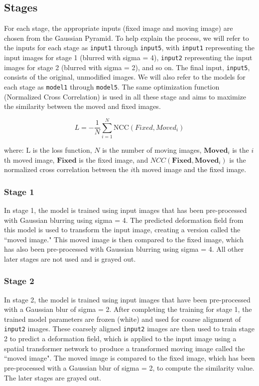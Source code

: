 \documentclass{book}
\begin{document}
	\subsection{Stages}
	For each stage, the appropriate inputs (fixed image and moving image) are chosen from the Gaussian Pyramid. To help explain the process, we will refer to the inputs for each stage as \texttt{input1} through \texttt{input5}, with \texttt{input1} representing the input images for stage 1 (blurred with sigma = 4), \texttt{input2} representing the input images for stage 2 (blurred with sigma = 2), and so on. The final input, \texttt{input5}, consists of the original, unmodified images. We will also refer to the models for each stage as \texttt{model1} through \texttt{model5}. The same optimization function (Normalized Cross Correlation) is used in all these stage and aims to maximize the similarity between the moved and fixed images.
	
	\begin{equation}
		L = -\frac{1}{N} \sum_{i=1}^N \text{NCC}(Fixed, Moved_i)
	\end{equation}
	
	where:
		$\text{L}$ is the loss function, $N$ is the number of moving images, $\mathbf{Moved}_i$ is the $i$th moved image, $\mathbf{Fixed}$ is the fixed image, and $NCC(\mathbf{Fixed}, \mathbf{Moved}_i)$ is the normalized cross correlation between the $i$th moved image and the fixed image.
	
	\subsubsection{Stage 1}
	In stage 1, the model is trained using input images that has been pre-processed with Gaussian blurring using sigma = 4. The predicted deformation field from this model is used to transform the input image, creating a version called the ``moved image." This moved image is then compared to the fixed image, which has also been pre-processed with Gaussian blurring using sigma = 4. All other later stages are not used and is grayed out.
	
	\subsubsection{Stage 2}
	In stage 2, the model is trained using input images that have been pre-processed with a Gaussian blur of sigma = 2. After completing the training for stage 1, the trained model parameters are frozen (white) and used for coarse alignment of \texttt{input2} images. These coarsely aligned \texttt{input2} images are then used to train stage 2 to predict a deformation field, which is applied to the input image using a spatial transformer network to produce a transformed moving image called the ``moved image". The moved image is compared to the fixed image, which has been pre-processed with a Gaussian blur of sigma = 2, to compute the similarity value. The later stages are grayed out.
	
\end{document}
